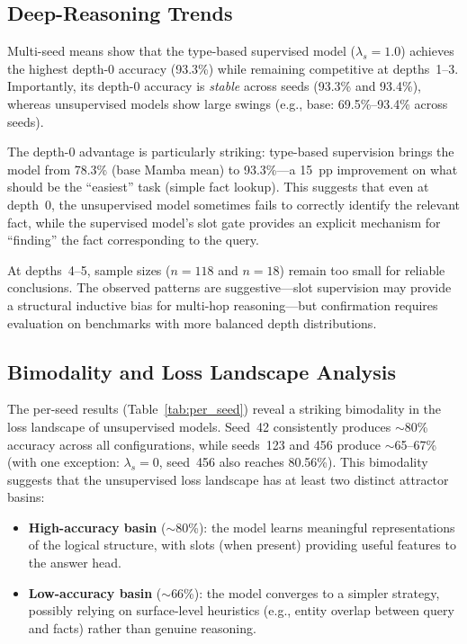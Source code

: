 \documentclass[conference]{IEEEtran}
\begin{document}
\subsection{Deep-Reasoning Trends}

Multi-seed means show that the type-based supervised model
($\lambda_s{=}1.0$) achieves the highest depth-0 accuracy
(93.3\%) while remaining competitive at depths~1--3.
Importantly, its depth-0 accuracy is \emph{stable} across
seeds (93.3\% and 93.4\%), whereas unsupervised models show
large swings (e.g., base: 69.5\%--93.4\% across seeds).

The depth-0 advantage is particularly striking: type-based
supervision brings the model from 78.3\% (base Mamba mean) to
93.3\%---a 15~pp improvement on what should be the ``easiest''
task (simple fact lookup).  This suggests that even at depth~0,
the unsupervised model sometimes fails to correctly identify
the relevant fact, while the supervised model's slot gate
provides an explicit mechanism for ``finding'' the fact
corresponding to the query.

At depths~4--5, sample sizes ($n{=}118$ and $n{=}18$) remain
too small for reliable conclusions.  The observed patterns
are suggestive---slot supervision may provide a structural
inductive bias for multi-hop reasoning---but confirmation
requires evaluation on benchmarks with more balanced depth
distributions.

\subsection{Bimodality and Loss Landscape Analysis}

The per-seed results (Table~\ref{tab:per_seed}) reveal a
striking bimodality in the loss landscape of unsupervised models.
Seed~42 consistently produces $\sim$80\% accuracy across all
configurations, while seeds~123 and 456 produce $\sim$65--67\%
(with one exception: $\lambda_s{=}0$, seed~456 also reaches
80.56\%).  This bimodality suggests that the unsupervised loss
landscape has at least two distinct attractor basins:

\begin{itemize}[nosep]
    \item \textbf{High-accuracy basin} ($\sim$80\%): the model
          learns meaningful representations of the logical
          structure, with slots (when present) providing useful
          features to the answer head.
    \item \textbf{Low-accuracy basin} ($\sim$66\%): the model
          converges to a simpler strategy, possibly relying on
          surface-level heuristics (e.g., entity overlap between
          query and facts) rather than genuine reasoning.
\end{itemize}
\end{document}
